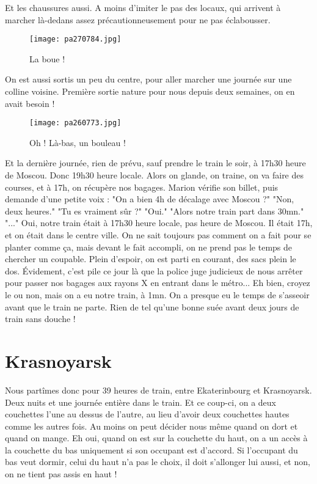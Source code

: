 \documentclass{book}
\begin{document}
Et les chaussures aussi. A moins d'imiter le pas des locaux, qui arrivent à marcher là-dedans assez précautionneusement pour ne pas éclabousser.


\begin{figure}[h]
\centering
\texttt{[image: pa270784.jpg]}
\caption*{ La boue !}
\end{figure}

On est aussi sortis un peu du centre, pour aller marcher une journée sur une colline voisine. Première sortie nature pour nous depuis deux semaines, on en avait besoin !


\begin{figure}[h]
\centering
\texttt{[image: pa260773.jpg]}
\caption*{ Oh ! Là-bas, un bouleau !}
\end{figure}

Et la dernière journée, rien de prévu, sauf prendre le train le soir, à 17h30 heure de Moscou. Donc 19h30 heure locale. Alors on glande, on traine, on va faire des courses, et à 17h, on récupère nos bagages. Marion vérifie son billet, puis demande d'une petite voix : "On a bien 4h de décalage avec Moscou ?"
"Non, deux heures."
"Tu es vraiment sûr ?"
"Oui."
"Alors notre train part dans 30mn."
"..."
Oui, notre train était à 17h30 heure locale, pas heure de Moscou. Il était 17h, et on était dans le centre ville. On ne sait toujours pas comment on a fait pour se planter comme ça, mais devant le fait accompli, on ne prend pas le temps de chercher un coupable.
Plein d'espoir, on est parti en courant, des sacs plein le dos. Évidement, c'est pile ce jour là que la police juge judicieux de nous arrêter pour passer nos bagages aux rayons X en entrant dans le métro...
Eh bien, croyez le ou non, mais on a eu notre train, à 1mn. On a presque eu le temps de s'asseoir avant que le train ne parte. Rien de tel qu'une bonne suée avant deux jours de train sans douche !



\chapter{Krasnoyarsk}
Nous partîmes donc pour 39 heures de train, entre Ekaterinbourg et Krasnoyarsk. Deux nuits et une journée entière dans le train. Et ce coup-ci, on a deux couchettes l'une au dessus de l'autre, au lieu d'avoir deux couchettes hautes comme les autres fois. Au moins on peut décider nous même quand on dort et quand on mange. Eh oui, quand on est sur la couchette du haut, on a un accès à la couchette du bas uniquement si son occupant est d'accord. Si l'occupant du bas veut dormir, celui du haut n'a pas le choix, il doit s'allonger lui aussi, et non, on ne tient pas assis en haut !
\end{document}
